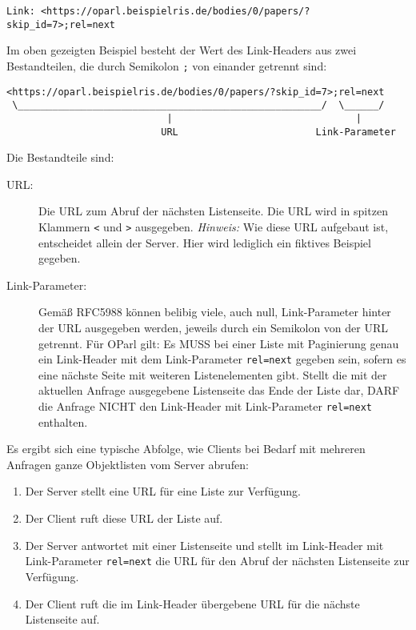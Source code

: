 \documentclass[,a4paper]{article}
\begin{document}
\begin{verbatim}
Link: <https://oparl.beispielris.de/bodies/0/papers/?skip_id=7>;rel=next
\end{verbatim}

Im oben gezeigten Beispiel besteht der Wert des Link-Headers aus zwei
Bestandteilen, die durch Semikolon \texttt{;} von einander getrennt
sind:

\begin{verbatim}
<https://oparl.beispielris.de/bodies/0/papers/?skip_id=7>;rel=next
 \_____________________________________________________/  \______/
                            |                                |
                           URL                        Link-Parameter
\end{verbatim}

Die Bestandteile sind:

\begin{description}
\item[URL:]
Die URL zum Abruf der nächsten Listenseite. Die URL wird in spitzen
Klammern \texttt{\textless{}} und \texttt{\textgreater{}} ausgegeben.
\emph{Hinweis:} Wie diese URL aufgebaut ist, entscheidet allein der
Server. Hier wird lediglich ein fiktives Beispiel gegeben.
\item[Link-Parameter:]
Gemäß RFC5988 können belibig viele, auch null, Link-Parameter hinter der
URL ausgegeben werden, jeweils durch ein Semikolon von der URL getrennt.
Für OParl gilt: Es MUSS bei einer Liste mit Paginierung genau ein
Link-Header mit dem Link-Parameter \texttt{rel=next} gegeben sein,
sofern es eine nächste Seite mit weiteren Listenelementen gibt. Stellt
die mit der aktuellen Anfrage ausgegebene Listenseite das Ende der Liste
dar, DARF die Anfrage NICHT den Link-Header mit Link-Parameter
\texttt{rel=next} enthalten.
\end{description}

Es ergibt sich eine typische Abfolge, wie Clients bei Bedarf mit
mehreren Anfragen ganze Objektlisten vom Server abrufen:

\begin{enumerate}
\def\labelenumi{\arabic{enumi}.}
\item
  Der Server stellt eine URL für eine Liste zur Verfügung.
\item
  Der Client ruft diese URL der Liste auf.
\item
  Der Server antwortet mit einer Listenseite und stellt im Link-Header
  mit Link-Parameter \texttt{rel=next} die URL für den Abruf der
  nächsten Listenseite zur Verfügung.
\item
  Der Client ruft die im Link-Header übergebene URL für die nächste
  Listenseite auf.
\end{enumerate}
\end{document}
